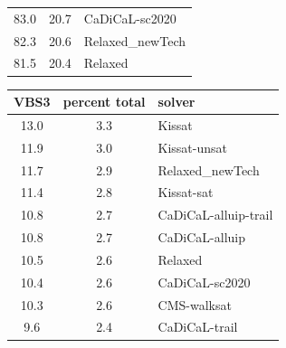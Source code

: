 \documentclass{elsarticle}
\begin{document}
\begin{table}
\begin{center}
\begin{tabular}{ccl}
\phantom{0}83.0 & 20.7 & CaDiCaL-sc2020 \\
\phantom{0}82.3 & 20.6 & Relaxed\_newTech \\
\phantom{0}81.5 & 20.4 & Relaxed \\
\end{tabular}
\end{center}
\begin{center}
\begin{tabular}{ccl}
VBS3 & percent total & solver \\
\hline
13.0 & 3.3 & Kissat \\
11.9 & 3.0 & Kissat-unsat \\
11.7 & 2.9 & Relaxed\_newTech \\
11.4 & 2.8 & Kissat-sat \\
10.8 & 2.7 & CaDiCaL-alluip-trail \\
10.8 & 2.7 & CaDiCaL-alluip \\
10.5 & 2.6 & Relaxed \\
10.4 & 2.6 & CaDiCaL-sc2020 \\
10.3 & 2.6 & CMS-walksat \\
\phantom{0}9.6 & 2.4 & CaDiCaL-trail \\
\end{tabular}
\end{center}
\end{table}
\end{document}
